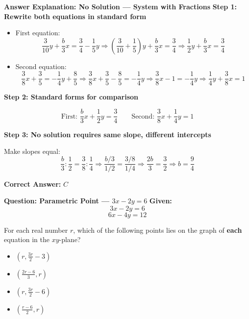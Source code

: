 \documentclass{beamer}
\begin{document}
\begin{frame}{\textbf{Answer Explanation: No Solution — System with Fractions}}
\small
\textbf{Step 1: Rewrite both equations in standard form}

\begin{itemize}
    \item First equation:
    \[
    \frac{3}{10}y + \frac{b}{3}x = \frac{3}{4} - \frac{1}{5}y
    \Rightarrow \left( \frac{3}{10} + \frac{1}{5} \right)y + \frac{b}{3}x = \frac{3}{4}
    \Rightarrow \frac{1}{2}y + \frac{b}{3}x = \frac{3}{4}
    \]

    \item Second equation:
    \[
    \frac{3}{8}x + \frac{3}{5} = -\frac{1}{4}y + \frac{8}{5}
    \Rightarrow \frac{3}{8}x + \frac{3}{5} - \frac{8}{5} = -\frac{1}{4}y
    \Rightarrow \frac{3}{8}x - 1 = -\frac{1}{4}y
    \Rightarrow \frac{1}{4}y + \frac{3}{8}x = 1
    \]
\end{itemize}

\textbf{Step 2: Standard forms for comparison}

\[
\text{First: } \frac{b}{3}x + \frac{1}{2}y = \frac{3}{4}
\qquad
\text{Second: } \frac{3}{8}x + \frac{1}{4}y = 1
\]

\textbf{Step 3: No solution requires same slope, different intercepts}

Make slopes equal:
\[
\frac{b}{3} : \frac{1}{2} = \frac{3}{8} : \frac{1}{4}
\Rightarrow \frac{b/3}{1/2} = \frac{3/8}{1/4} \Rightarrow \frac{2b}{3} = \frac{3}{2}
\Rightarrow b = \frac{9}{4}
\]

\textbf{Correct Answer:} \( \boxed{C} \)
\end{frame}


\begin{frame}{\textbf{Question: Parametric Point — \( 3x - 2y = 6 \)}}
\textbf{Given:}
\[
3x - 2y = 6 
\]
\[6x - 4y = 12\]

For each real number \( r \), which of the following points lies on the graph of \textbf{each} equation in the \( xy \)-plane?

\begin{itemize}
    \item[\textbf{A.}] \( \left( r, \frac{3r}{2} - 3 \right) \)
    \item[\textbf{B.}] \( \left( \frac{2r - 6}{3}, r \right) \)
    \item[\textbf{C.}] \( \left( r, \frac{3r}{2} - 6 \right) \)
    \item[\textbf{D.}] \( \left( \frac{r - 6}{2}, r \right) \)
\end{itemize}
\end{frame}
\end{document}
